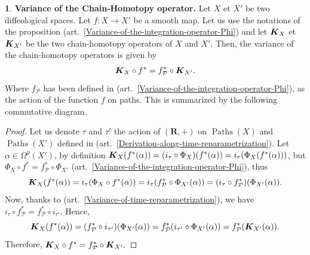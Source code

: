 \documentclass[11pt,reqno]{amsart}
\theoremstyle{definition}
\newtheorem{article}{}
\newcommand{\artlabel}[1]{{\bf #1.}}
\newcommand{\RR}{{\mathbf R}}
\def \X{{X}}
\newcommand{\cP}{{\mathcal P}}
\newcommand{\eK}{\mbox{\boldmath $K$}}
\newcommand{\art}[1]{{(art.~\ref{#1})}}
\newcommand{\DForms}{\Omega}
\newcommand{\Paths}{\operatorname{Paths}}
\def \fPaths#1{#1_{\cP}}
\begin{document}
  \begin{article}\artlabel{Variance of the Chain-Homotopy operator} 
    \label{Variance-of-the-Chain-Homotopy-operator}
    Let $\X$ et $\X'$ be two diffeological spaces. Let
    $f: \X \to \X'$ be a smooth map. Let us use
    the notations of the proposition
    \art{Variance-of-the-integration-operator-Phi} and let
    $\eK_\X$ et $\eK_{\X'}$ be the two chain-homotopy
    operators of $\X$ and $\X'$. Then, the
    variance of the chain-homotopy operators is given by
    $$
      \eK_\X \circ f^* = \fPaths{f}^* \circ \eK_{\X'}.
      $$
    Where $\fPaths{f}$ has been defined in
    \art{Variance-of-the-integration-operator-Phi}, as the
    action of the function $f$ on paths. This is
    summarized by the following commutative diagram.
  \begin{center}
\end{center}

  \end{article} %
  
  \begin{proof} Let us denote $\tau$ and $\tau'$ the action
    of $(\RR,+)$ on $\Paths(\X)$ and $\Paths(\X')$ defined in
    \art{Derivation-along-time-reparametrization}. Let
    $\alpha \in \DForms^p(\X')$, by definition
    $\eK_\X(f^*(\alpha)) =  (i_\tau \circ
      \Phi_\X)(f^*(\alpha)) =  i_{\tau}(\Phi_\X(f^*(\alpha)))$,
    but $\Phi_\X \circ f^* =  \fPaths{f}^* \circ \Phi_{\X'}$
    \art{Variance-of-the-integration-operator-Phi}, thus 
    $$
      \eK_\X(f^*(\alpha)) =  i_{\tau}(\Phi_\X \circ
      f^*(\alpha)) =  i_{\tau}(\fPaths{f}^* \circ
      \Phi_{\X'}(\alpha)) = (i_{\tau} \circ
      \fPaths{f}^*)(\Phi_{\X'}(\alpha)).
      $$ 
    Now, thanks to \art{Variance-of-time-reparametrization},
    we have $i_{\tau} \circ \fPaths{f}^* = \fPaths{f}^* \circ
      i_{\tau'}$. Hence, 
    $$
      \eK_\X(f^*(\alpha)) = (\fPaths{f}^* \circ
      i_{\tau'})(\Phi_{\X'}(\alpha)) =  \fPaths{f}^*(i_{\tau'}
      \circ \Phi_{\X'}(\alpha)) = 
      \fPaths{f}^*(\eK_{\X'}(\alpha)).
      $$
    Therefore, $\eK_\X \circ f^* = \fPaths{f}^* \circ
      \eK_{\X'}.$
  \end{proof}
  
\end{document}
